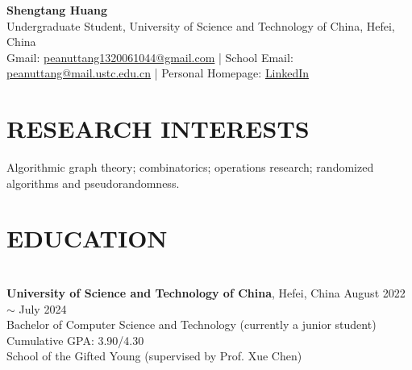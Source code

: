 \documentclass[a4paper,9pt]{extarticle}
\begin{document}
\pagestyle{fancy}
\renewcommand{\headrulewidth}{0pt}
\fancyhead{}
\fancyhead[R]{\textit{\today}}
\thispagestyle{empty} %

\begin{flushleft}
\textbf{\LARGE Shengtang Huang}\\[2pt] %
Undergraduate Student, University of Science and Technology of China, Hefei, China
\\ Gmail: \href{mailto:peanuttang1320061044@gmail.com}{peanuttang1320061044@gmail.com} | School Email: \href{mailto:peanuttang@mail.ustc.edu.cn}{peanuttang@mail.ustc.edu.cn} | Personal Homepage: \href{https://shengtanghuang.netlify.app/about/}{LinkedIn} %
\end{flushleft}

\section*{RESEARCH INTERESTS}
\noindent
Algorithmic graph theory; combinatorics; operations research; randomized algorithms and pseudorandomness.
\section*{EDUCATION}

\noindent\\
\textbf{University of Science and Technology of China},  Hefei, China \hfill August 2022 $\sim$ July 2024\\ %
Bachelor of Computer Science and Technology (currently a junior student) \hfill Cumulative GPA: 3.90/4.30 \\
School of the Gifted Young (supervised by Prof. Xue Chen)

\end{document}
